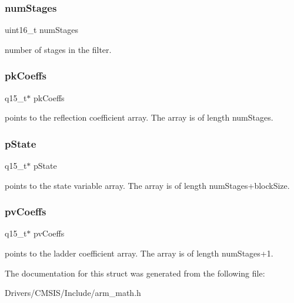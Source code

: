 \subsubsection{\texorpdfstring{num\+Stages}{numStages}}
{\footnotesize\ttfamily uint16\+\_\+t num\+Stages}

number of stages in the filter. \mbox{\label{structarm__iir__lattice__instance__q15_a12497c299b0341c18d497f8ab3465084}} 
\subsubsection{\texorpdfstring{pk\+Coeffs}{pkCoeffs}}
{\footnotesize\ttfamily q15\+\_\+t$\ast$ pk\+Coeffs}

points to the reflection coefficient array. The array is of length num\+Stages. \mbox{\label{structarm__iir__lattice__instance__q15_ae29dfdb736374fcddaeaec4b7770170c}} 
\subsubsection{\texorpdfstring{p\+State}{pState}}
{\footnotesize\ttfamily q15\+\_\+t$\ast$ p\+State}

points to the state variable array. The array is of length num\+Stages+block\+Size. \mbox{\label{structarm__iir__lattice__instance__q15_a52866ed127c7b2a8a102e2ed1a2ebab8}} 
\subsubsection{\texorpdfstring{pv\+Coeffs}{pvCoeffs}}
{\footnotesize\ttfamily q15\+\_\+t$\ast$ pv\+Coeffs}

points to the ladder coefficient array. The array is of length num\+Stages+1. 

The documentation for this struct was generated from the following file\+:\begin{DoxyCompactItemize}
\item 
Drivers/\+C\+M\+S\+I\+S/\+Include/arm\+\_\+math.\+h\end{DoxyCompactItemize}
